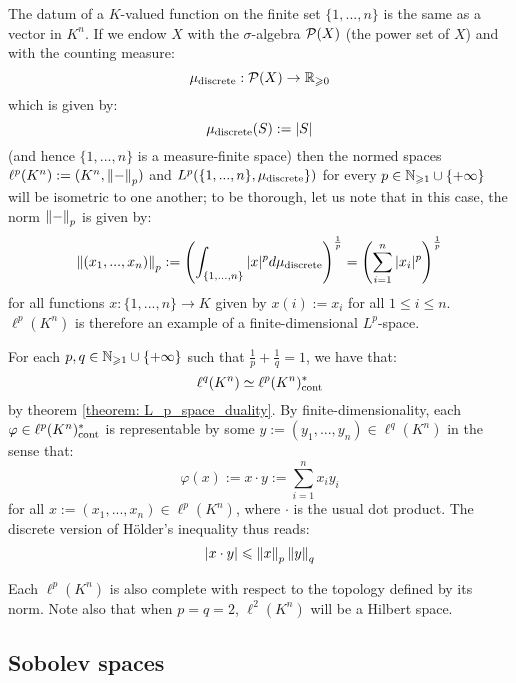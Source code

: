         \begin{example}
            The datum of a $K$-valued function on the finite set $\{1, ..., n\}$ is the same as a vector in $K^n$. If we endow $X$ with the $\sigma$-algebra $\mathcal{P}(X)$ (the power set of $X$) and with the counting measure:
                $$\mu_{\mathrm{discrete}}: \mathcal{P}(X) \to \mathbb{R}_{\geqslant 0}$$
            which is given by:
                $$\mu_{\mathrm{discrete}}(S) := |S|$$
            (and hence $\{1, ..., n\}$ is a measure-finite space) then the normed spaces $\ell^p(K^n) := (K^n, \left\| {-} \right\|_p)$ and $L^p(\{1, ..., n\}, \mu_{\mathrm{discrete}}\})$ for every $p \in \mathbb{N}_{\geqslant 1} \cup \{+\infty\}$ will be isometric to one another; to be thorough, let us note that in this case, the norm $\left\| {-} \right\|_p$ is given by:
                $$\left\| {(x_1, ..., x_n)} \right\|_p := \left( \int_{\{1, ..., n\}} |x|^p d\mu_{\mathrm{discrete}} \right)^{\frac1p} = \left( \sum_{i = 1}^n |x_i|^p \right)^{\frac1p}$$
            for all functions $x: \{1, ..., n\} \to K$ given by $x(i) := x_i$ for all $1 \leq i \leq n$. $\ell^p(K^n)$ is therefore an example of a finite-dimensional $L^p$-space.

            For each $p, q \in \mathbb{N}_{\geqslant 1} \cup \{+\infty\}$ such that $\frac1p + \frac1q = 1$, we have that:
                $$\ell^q(K^n) \simeq \ell^p(K^n)^*_{\mathrm{cont}}$$
            by theorem \ref{theorem: L_p_space_duality}. By finite-dimensionality, each $\varphi \in \ell^p(K^n)^*_{\mathrm{cont}}$ is representable by some $y := (y_1, ..., y_n) \in \ell^q(K^n)$ in the sense that:
                $$\varphi(x) := x \cdot y := \sum_{i = 1}^n x_i y_i$$
            for all $x := (x_1, ..., x_n) \in \ell^p(K^n)$, where $\cdot$ is the usual dot product. The discrete version of H\"older's inequality thus reads:
                $$\left\lvert {x \cdot y} \right\rvert \leqslant \left\| {x} \right\|_p \left\| {y} \right\|_q$$

            Each $\ell^p(K^n)$ is also complete with respect to the topology defined by its norm. Note also that when $p = q = 2$, $\ell^2(K^n)$ will be a Hilbert space.
        \end{example}

    \subsection{Sobolev spaces}